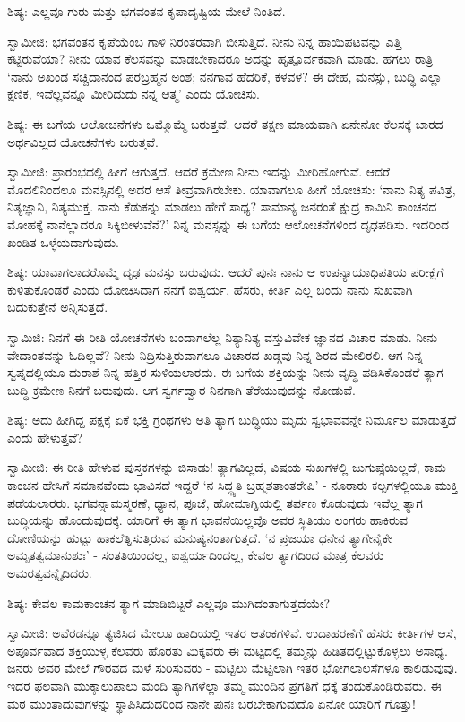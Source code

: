 ಶಿಷ್ಯ: ಎಲ್ಲವೂ ಗುರು ಮತ್ತು ಭಗವಂತನ ಕೃಪಾದೃಷ್ಟಿಯ ಮೇಲೆ ನಿಂತಿದೆ.

ಸ್ವಾಮೀಜಿ: ಭಗವಂತನ ಕೃಪೆಯೆಂಬ ಗಾಳಿ ನಿರಂತರವಾಗಿ ಬೀಸುತ್ತಿದೆ. ನೀನು ನಿನ್ನ ಹಾಯಿಪಟವನ್ನು ಎತ್ತಿ ಕಟ್ಟಿರುವೆಯಾ? ನೀನು ಯಾವ ಕೆಲಸವನ್ನು ಮಾಡಬೇಕಾದರೂ ಅದನ್ನು ಹೃತ್ಪೂರ್ವಕವಾಗಿ ಮಾಡು. ಹಗಲು ರಾತ್ರಿ ‘ನಾನು ಅಖಂಡ ಸಚ್ಚಿದಾನಂದ ಪರಬ್ರಹ್ಮನ ಅಂಶ; ನನಗಾವ ಹೆದರಿಕೆ, ಕಳವಳ? ಈ ದೇಹ, ಮನಸ್ಸು, ಬುದ್ಧಿ ಎಲ್ಲಾ ಕ್ಷಣಿಕ, ಇವೆಲ್ಲವನ್ನೂ ಮೀರಿದುದು ನನ್ನ ಆತ್ಮ’ ಎಂದು ಯೋಚಿಸು.

ಶಿಷ್ಯ: ಈ ಬಗೆಯ ಆಲೋಚನೆಗಳು ಒಮ್ಮೊಮ್ಮೆ ಬರುತ್ತವೆ. ಆದರೆ ತಕ್ಷಣ ಮಾಯವಾಗಿ ಏನೇನೋ ಕೆಲಸಕ್ಕೆ ಬಾರದ ಅರ್ಥವಿಲ್ಲದ ಯೋಚನೆಗಳು ಬರುತ್ತವೆ.

ಸ್ವಾಮೀಜಿ: ಪ್ರಾರಂಭದಲ್ಲಿ ಹೀಗೆ ಆಗುತ್ತದೆ. ಆದರೆ ಕ್ರಮೇಣ ನೀನು ಇದನ್ನು ಮೀರಿಹೋಗುವೆ. ಆದರೆ ಮೊದಲಿನಿಂದಲೂ ಮನಸ್ಸಿನಲ್ಲಿ ಅದರ ಆಸೆ ತೀವ್ರವಾಗಿರಬೇಕು. ಯಾವಾಗಲೂ ಹೀಗೆ ಯೋಚಿಸು: ‘ನಾನು ನಿತ್ಯ ಪವಿತ್ರ, ನಿತ್ಯಜ್ಞಾನಿ, ನಿತ್ಯಮುಕ್ತ. ನಾನು ಕೆಡುಕನ್ನು ಮಾಡಲು ಹೇಗೆ ಸಾಧ್ಯ? ಸಾಮಾನ್ಯ ಜನರಂತೆ ಕ್ಷುದ್ರ ಕಾಮಿನಿ ಕಾಂಚನದ ಮೋಹಕ್ಕೆ ನಾನೆಲ್ಲಾದರೂ ಸಿಕ್ಕಿಬೀಳುವೆನೆ?’ ನಿನ್ನ ಮನಸ್ಸನ್ನು ಈ ಬಗೆಯ ಆಲೋಚನೆಗಳಿಂದ ದೃಢಪಡಿಸು. ಇದರಿಂದ ಖಂಡಿತ ಒಳ್ಳೆಯದಾಗುವುದು.

ಶಿಷ್ಯ: ಯಾವಾಗಲಾದರೊಮ್ಮೆ ದೃಢ ಮನಸ್ಸು ಬರುವುದು. ಆದರೆ ಪುನಃ ನಾನು ಆ ಉಪನ್ಯಾಯಾಧಿಪತಿಯ ಪರೀಕ್ಷೆಗೆ ಕುಳಿತುಕೊಂಡರೆ ಎಂದು ಯೋಚಿಸಿದಾಗ ನನಗೆ ಐಶ್ವರ್ಯ, ಹೆಸರು, ಕೀರ್ತಿ ಎಲ್ಲ ಬಂದು ನಾನು ಸುಖವಾಗಿ ಬದುಕುತ್ತೇನೆ ಅನ್ನಿಸುತ್ತದೆ.

ಸ್ವಾಮಿಜಿ: ನಿನಗೆ ಈ ರೀತಿ ಯೋಚನೆಗಳು ಬಂದಾಗಲೆಲ್ಲ ನಿತ್ಯಾನಿತ್ಯ ವಸ್ತುವಿವೇಕ ಜ್ಞಾನದ ವಿಚಾರ ಮಾಡು. ನೀನು ವೇದಾಂತವನ್ನು ಓದಿಲ್ಲವೆ? ನೀನು ನಿದ್ರಿಸುತ್ತಿರುವಾಗಲೂ ವಿಚಾರದ ಖಡ್ಗವು ನಿನ್ನ ಶಿರದ ಮೇಲಿರಲಿ. ಆಗ ನಿನ್ನ ಸ್ವಪ್ನದಲ್ಲಿಯೂ ದುರಾಶೆ ನಿನ್ನ ಹತ್ತಿರ ಸುಳಿಯಲಾರದು. ಈ ಬಗೆಯ ಶಕ್ತಿಯನ್ನು ನೀನು ವೃದ್ಧಿ ಪಡಿಸಿಕೊಂಡರೆ ತ್ಯಾಗ ಬುದ್ಧಿ ಕ್ರಮೇಣ ನಿನಗೆ ಬರುವುದು. ಆಗ ಸ್ವರ್ಗದ್ವಾರ ನಿನಗಾಗಿ ತೆರೆಯುವುದನ್ನು ನೋಡುವೆ.

ಶಿಷ್ಯ: ಅದು ಹೀಗಿದ್ದ ಪಕ್ಷಕ್ಕೆ ಏಕೆ ಭಕ್ತಿ ಗ್ರಂಥಗಳು ಅತಿ ತ್ಯಾಗ ಬುದ್ಧಿಯು ಮೃದು ಸ್ವಭಾವವನ್ನೇ ನಿರ್ಮೂಲ ಮಾಡುತ್ತದೆ ಎಂದು ಹೇಳುತ್ತವೆ?

ಸ್ವಾಮೀಜಿ: ಈ ರೀತಿ ಹೇಳುವ ಪುಸ್ತಕಗಳನ್ನು ಬಿಸಾಡು! ತ್ಯಾಗವಿಲ್ಲದೆ, ವಿಷಯ ಸುಖಗಳಲ್ಲಿ ಜುಗುಪ್ಸೆಯಿಲ್ಲದೆ, ಕಾಮ ಕಾಂಚನ ಹೇಸಿಗೆ ಸಮಾನವೆಂದು ಭಾವಿಸದೆ ಇದ್ದರೆ ‘ನ ಸಿದ್ಧ್ಯತಿ ಬ್ರಹ್ಮಶತಾಂತರೇಪಿ’ - ನೂರಾರು ಕಲ್ಪಗಳಲ್ಲಿಯೂ ಮುಕ್ತಿ ಪಡೆಯಲಾರರು. ಭಗವನ್ನಾಮಸ್ಮರಣೆ, ಧ್ಯಾನ, ಪೂಜೆ, ಹೋಮಾಗ್ನಿಯಲ್ಲಿ ತರ್ಪಣ ಕೊಡುವುದು ಇವೆಲ್ಲ ತ್ಯಾಗ ಬುದ್ಧಿಯನ್ನು ಹೊಂದುವುದಕ್ಕೆ. ಯಾರಿಗೆ ಈ ತ್ಯಾಗ ಭಾವನೆಯಿಲ್ಲವೊ ಅವರ ಸ್ಥಿತಿಯು ಲಂಗರು ಹಾಕಿರುವ ದೋಣಿಯನ್ನು ಹುಟ್ಟು ಹಾಕಲೆತ್ನಿಸುತ್ತಿರುವ ಮನುಷ್ಯನಂತಾಗುತ್ತದೆ. ‘ನ ಪ್ರಜಯಾ ಧನೇನ ತ್ಯಾಗೇನೈಕೇ ಅಮೃತತ್ವಮಾನುಶುಃ’ - ಸಂತತಿಯಿಂದಲ್ಲ, ಐಶ್ವರ್ಯದಿಂದಲ್ಲ, ಕೇವಲ ತ್ಯಾಗದಿಂದ ಮಾತ್ರ ಕೆಲವರು ಅಮರತ್ವವನ್ನೈದಿದರು.

ಶಿಷ್ಯ: ಕೇವಲ ಕಾಮಕಾಂಚನ ತ್ಯಾಗ ಮಾಡಿಬಿಟ್ಟರೆ ಎಲ್ಲವೂ ಮುಗಿದಂತಾಗುತ್ತದೆಯೇ?

ಸ್ವಾಮೀಜಿ: ಅವೆರಡನ್ನೂ ತ್ಯಜಿಸಿದ ಮೇಲೂ ಹಾದಿಯಲ್ಲಿ ಇತರ ಆತಂಕಗಳಿವೆ. ಉದಾಹರಣೆಗೆ ಹೆಸರು ಕೀರ್ತಿಗಳ ಆಸೆ, ಅಪೂರ್ವವಾದ ಶಕ್ತಿಯುಳ್ಳ ಕೆಲವರು ಹೊರತು ಮಿಕ್ಕವರು ಈ ಮಟ್ಟದಲ್ಲಿ ತಮ್ಮನ್ನು ಹಿಡಿತದಲ್ಲಿಟ್ಟುಕೊಳ್ಳಲು ಅಸಾಧ್ಯ. ಜನರು ಅವರ ಮೇಲೆ ಗೌರವದ ಮಳೆ ಸುರಿಸುವರು - ಮಟ್ಟಿಲು ಮೆಟ್ಟಿಲಾಗಿ ಇತರ ಭೋಗಲಾಲಸೆಗಳೂ ಕಾಲಿಡುವುವು. ಇದರ ಫಲವಾಗಿ ಮುಕ್ಕಾಲುಪಾಲು ಮಂದಿ ತ್ಯಾಗಿಗಳೆಲ್ಲಾ ತಮ್ಮ ಮುಂದಿನ ಪ್ರಗತಿಗೆ ಧಕ್ಕೆ ತಂದುಕೊಂಡಿರುವರು. ಈ ಮಠ ಮುಂತಾದುವುಗಳನ್ನು ಸ್ಥಾಪಿಸಿದುದರಿಂದ ನಾನೇ ಪುನಃ ಬರಬೇಕಾಗುವುದೊ ಏನೋ ಯಾರಿಗೆ ಗೊತ್ತು!

